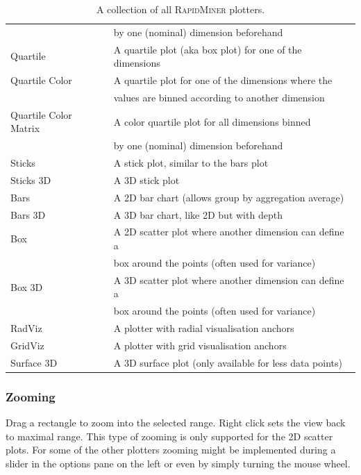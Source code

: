 \documentclass[11pt]{article}
\newcommand{\rapidminer}{\protect \textsc{RapidMiner}\xspace}
\begin{document}
\begin{table}[htbp]
\begin{tabular}{|l|l|}
                            & by one (nominal) dimension beforehand \\
    Quartile          & A quartile plot (aka box plot) for one of the dimensions \\
    Quartile Color    & A quartile plot for one of the dimensions where the \\
                      & values are binned according to another dimension \\
    Quartile Color Matrix   & A color quartile plot for all dimensions binned \\
                            & by one (nominal) dimension beforehand \\
    Sticks            & A stick plot, similar to the bars plot \\
    Sticks 3D         & A 3D stick plot \\
    Bars              & A 2D bar chart (allows group by aggregation average) \\
    Bars 3D           & A 3D bar chart, like 2D but with depth \\
    Box               & A 2D scatter plot where another dimension can define a \\
                      & box around the points (often used for variance) \\
    Box 3D            & A 3D scatter plot where another dimension can define a \\
                      & box around the points (often used for variance) \\ 
    RadViz            & A plotter with radial visualisation anchors \\
    GridViz           & A plotter with grid visualisation anchors \\
    Surface 3D        & A 3D surface plot (only available for less data points) \\
    \hline
  \end{tabular}
  \caption{A collection of all \rapidminer plotters.}
  \label{tab:plotters_overview}
\end{table}



\subsubsection{Zooming}

Drag a rectangle to zoom into the selected range. Right click sets the
view back to maximal range. This type of zooming is only supported for the 2D
scatter plots. For some of the other plotters zooming might be implemented
during a slider in the options pane on the left or even by simply turning the
mouse wheel.
\end{document}
